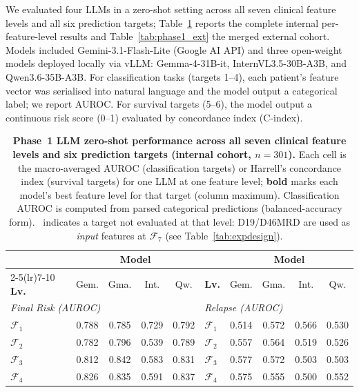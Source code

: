 \documentclass[pdflatex,sn-nature]{sn-jnl}
\begin{document}
We evaluated four LLMs in a zero-shot setting across all seven
clinical feature levels and all six prediction targets; Table~\ref{tab:phase1_full}
reports the complete internal per-feature-level results and
Table~\ref{tab:phase1_ext} the merged external cohort.
Models included Gemini-3.1-Flash-Lite (Google AI API) and three
open-weight models deployed locally via vLLM: Gemma-4-31B-it,
InternVL3.5-30B-A3B, and Qwen3.6-35B-A3B.
For classification tasks (targets 1--4), each patient's feature vector
was serialised into natural language and the model output a categorical
label; we report AUROC.
For survival targets (5--6), the model output a continuous risk score
(0--1) evaluated by concordance index (C-index).

\begin{table}[!t]
\caption{\textbf{Phase~1 LLM zero-shot performance across all seven clinical feature levels and six prediction targets (internal cohort, $n=301$).} Each cell is the macro-averaged AUROC (classification targets) or Harrell's concordance index (survival targets) for one LLM at one feature level; \textbf{bold} marks each model's best feature level for that target (column maximum). Classification AUROC is computed from parsed categorical predictions (balanced-accuracy form). \textemdash{}~indicates a target not evaluated at that level: D19/D46MRD are used as \emph{input} features at $\mathcal{F}_7$ (see Table~\ref{tab:expdesign}).}
\label{tab:phase1_full}
\centering
\small
\setlength{\tabcolsep}{4pt}
\begin{tabular}{l cccc @{\hskip 1.6em} l cccc}
\toprule
 & \multicolumn{4}{c}{\textbf{Model}} & & \multicolumn{4}{c}{\textbf{Model}} \\
\cmidrule(lr){2-5}\cmidrule(lr){7-10}
\textbf{Lv.} & Gem. & Gma. & Int. & Qw. & \textbf{Lv.} & Gem. & Gma. & Int. & Qw. \\
\midrule
\multicolumn{5}{l}{\textit{Final Risk (AUROC)}} & \multicolumn{5}{l}{\textit{Relapse (AUROC)}} \\
$\mathcal{F}_1$ & 0.788 & 0.785 & 0.729 & 0.792 & $\mathcal{F}_1$ & 0.514 & 0.572 & 0.566 & 0.530 \\
$\mathcal{F}_2$ & 0.782 & 0.796 & 0.539 & 0.789 & $\mathcal{F}_2$ & 0.557 & 0.564 & 0.519 & 0.526 \\
$\mathcal{F}_3$ & 0.812 & 0.842 & 0.583 & 0.831 & $\mathcal{F}_3$ & 0.577 & 0.572 & 0.503 & 0.503 \\
$\mathcal{F}_4$ & 0.826 & 0.835 & 0.591 & 0.837 & $\mathcal{F}_4$ & 0.575 & 0.555 & 0.500 & 0.552 \\

\end{tabular}
\end{table}
\end{document}
